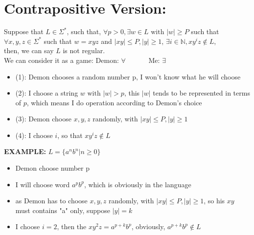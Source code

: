 \documentclass [9 pt]{article}
\theoremstyle{definition}
\begin{document}
\section*{Contrapositive Version:}
Suppose that $L \in \Sigma^*$, such that, $\forall p > 0, \exists w \in L \text{ with } |w| \geq P$ such that $\forall x, y, z \in \Sigma^*$ such that $ w = xyz$ and $|xy| \leq P, |y | \geq 1$, $\exists i \in \mathbb{N}, xy^i z \notin L$, \\
then, we can say $L$ is not regular.\\
\newline
We can consider it as a game:
Demon: $\forall\quad\quad\quad$ Me: $\exists$
\begin{itemize}
	\item(1): Demon chooses a random number p, I won't know what he will choose
	\item(2): I choose a string $w\text{ with } |w| > p$,  this $|w|$ tends to be represented in terms of $p$, which means I do operation according to Demon's choice
	\item(3): Demon choose $ x, y, z $ randomly, with $|x y| \leq P, |y| \geq 1 $
	\item(4): I choose $i$, so that $xy^{i}z \notin L$ 
\end{itemize} 

\newpage
\textbf{EXAMPLE:} $L = \{a^n b^n | n \geq 0 \}$
\begin{itemize}
	\item Demon choose number p
	\item I will choose word $a^pb^p$, which is obviously in the language
	\item as Demon has to choose $ x, y, z $ randomly, with $|x y| \leq P, |y| \geq 1 $, so his $xy$ must contains "a" only, suppose $|y| = k$
	\item I choose $i = 2$, then the $xy^2z = a^{p + k} b^{p}$, obviously, $a^{p + k} b^{p} \notin L$
\end{itemize}
\end{document}
